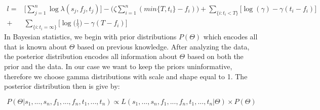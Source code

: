 \[
\begin{aligned}
l = & \Bigg[ \sum_{j=1}^{n} \log \lambda(s_{j},f_{j}, t_{j}) \Bigg] - \bigg(\zeta \sum_{i=1}^{n} (min\{ T, t_i \} - f_i) \bigg)  + \sum_{\{ i : t_{i} < T \} }  \bigg[\log (\gamma) -\gamma(t_{i} - f_{i}) \bigg] \\
+ & \sum_{ \{ i : t_{i} = \infty \} } \bigg[\log \bigg(\frac{1}{\gamma}\bigg) -\gamma(T - f_{i}) \bigg]
\end{aligned}
\]
In Bayesian statistics, we begin with prior distributions $P(\Theta)$ which encodes all that is known about $\Theta$ based on previous knowledge. After analyzing the data, the posterior distribution encodes all information about $\Theta$ based on both the prior and the data. In our case we want to keep the priors uninformative, therefore we choose gamma distributions with scale and shape equal to 1. The posterior distribution then is give by:

\[
P(\Theta | s_{1}, ..., s_{n}, f_{1}, ... , f_{n}, t_{1}, ..., t_{n}) \propto L(s_{1}, ..., s_{n}, f_{1}, ... , f_{n}, t_{1}, ..., t_{n} | \Theta) \times P(\Theta)
\]


